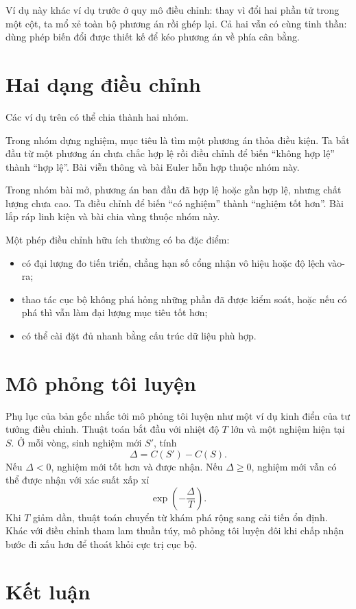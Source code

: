 \documentclass[11pt]{article}
\begin{document}
Ví dụ này khác ví dụ trước ở quy mô điều chỉnh: thay vì đổi hai phần tử trong
một cột, ta mổ xẻ toàn bộ phương án rồi ghép lại. Cả hai vẫn có cùng tinh thần:
dùng phép biến đổi được thiết kế để kéo phương án về phía cân bằng.

\section{Hai dạng điều chỉnh}

Các ví dụ trên có thể chia thành hai nhóm.

Trong nhóm dựng nghiệm, mục tiêu là tìm một phương án thỏa điều kiện. Ta bắt
đầu từ một phương án chưa chắc hợp lệ rồi điều chỉnh để biến ``không hợp lệ''
thành ``hợp lệ''. Bài viễn thông và bài Euler hỗn hợp thuộc nhóm này.

Trong nhóm bài mở, phương án ban đầu đã hợp lệ hoặc gần hợp lệ, nhưng chất
lượng chưa cao. Ta điều chỉnh để biến ``có nghiệm'' thành ``nghiệm tốt hơn''.
Bài lắp ráp linh kiện và bài chia vàng thuộc nhóm này.

Một phép điều chỉnh hữu ích thường có ba đặc điểm:
\begin{itemize}
  \item có đại lượng đo tiến triển, chẳng hạn số cổng nhận vô hiệu hoặc độ lệch
  vào-ra;
  \item thao tác cục bộ không phá hỏng những phần đã được kiểm soát, hoặc nếu
  có phá thì vẫn làm đại lượng mục tiêu tốt hơn;
  \item có thể cài đặt đủ nhanh bằng cấu trúc dữ liệu phù hợp.
\end{itemize}

\section{Mô phỏng tôi luyện}

Phụ lục của bản gốc nhắc tới mô phỏng tôi luyện như một ví dụ kinh điển của
tư tưởng điều chỉnh. Thuật toán bắt đầu với nhiệt độ \(T\) lớn và một nghiệm
hiện tại \(S\). Ở mỗi vòng, sinh nghiệm mới \(S'\), tính
\[
  \Delta=C(S')-C(S).
\]
Nếu \(\Delta<0\), nghiệm mới tốt hơn và được nhận. Nếu \(\Delta\ge0\), nghiệm
mới vẫn có thể được nhận với xác suất xấp xỉ
\[
  \exp\!\left(-\frac{\Delta}{T}\right).
\]
Khi \(T\) giảm dần, thuật toán chuyển từ khám phá rộng sang cải tiến ổn định.
Khác với điều chỉnh tham lam thuần túy, mô phỏng tôi luyện đôi khi chấp nhận
bước đi xấu hơn để thoát khỏi cực trị cục bộ.

\section{Kết luận}
\end{document}
